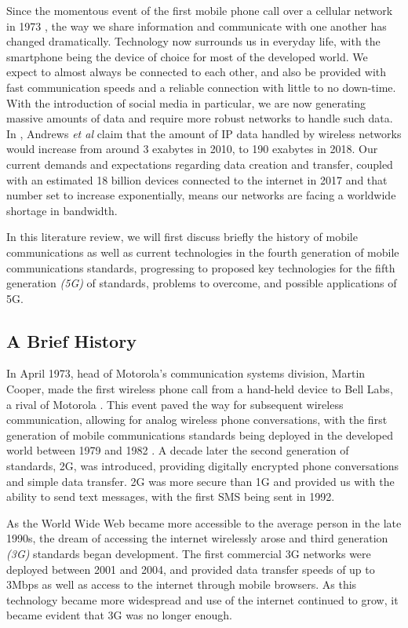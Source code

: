 \documentclass[journal]{IEEEtran}
\begin{document}
Since the momentous event of the first mobile phone call over a cellular network in 1973 \cite{tomfarhist}, the way we share information and communicate with one another has changed dramatically. Technology now surrounds us in everyday life, with the smartphone being the device of choice for most of the developed world. We expect to almost always be connected to each other, and also be provided with fast communication speeds and a reliable connection with little to no down-time. With the introduction of social media in particular, we are now generating massive amounts of data and require more robust networks to handle such data. In \cite{whatwill5gbe}, Andrews \textit{et al} claim that the amount of IP data handled by wireless networks would increase from around 3 exabytes in 2010, to 190 exabytes in 2018. Our current demands and expectations regarding data creation and transfer, coupled with an estimated 18 billion devices connected to the internet in 2017 \cite{ericssondev} and that number set to increase exponentially, means our networks are facing a worldwide shortage in bandwidth.

In this literature review, we will first discuss briefly the history of mobile communications as well as current technologies in the fourth generation of mobile communications standards, progressing to proposed key technologies for the fifth generation \textit{(5G)} of standards, problems to overcome, and possible applications of 5G.

\subsection{A Brief History}
In April 1973, head of Motorola's communication systems division, Martin Cooper, made the first wireless phone call from a hand-held device to Bell Labs, a rival of Motorola \cite{tomfarhist}. This event paved the way for subsequent wireless communication, allowing for analog wireless phone conversations, with the first generation of mobile communications standards being deployed in the developed world between 1979 and 1982 \cite{evolution}. A decade later the second generation of standards, 2G, was introduced, providing digitally encrypted phone conversations and simple data transfer. 2G was more secure than 1G and provided us with the ability to send text messages, with the first SMS being sent in 1992. 

As the World Wide Web became more accessible to the average person in the late 1990s, the dream of accessing the internet wirelessly arose and third generation \textit{(3G)} standards began development. The first commercial 3G networks were deployed between 2001 and 2004, and provided data transfer speeds of up to 3Mbps \cite{tomfarhist} as well as access to the internet through mobile browsers. As this technology became more widespread and use of the internet continued to grow, it became evident that 3G was no longer enough.
\end{document}
